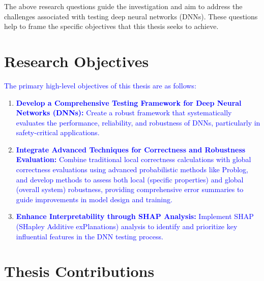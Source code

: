   \smallskip\noindent%
  The above research questions guide the investigation and aim to address the challenges associated with testing deep neural networks (DNNs). These questions help to frame the specific objectives that this thesis seeks to achieve. 
  
  \section{Research Objectives}
  
  \textcolor{blue}{The primary high-level objectives of this thesis are as follows:}
  
  \begin{enumerate}
    \item \textcolor{blue}{\textbf{Develop a Comprehensive Testing Framework for Deep Neural Networks (DNNs):}
    Create a robust framework that systematically evaluates the performance, reliability, and robustness of DNNs, particularly in safety-critical applications.}
    
    \item \textcolor{blue}{\textbf{Integrate Advanced Techniques for Correctness and Robustness Evaluation:}
    Combine traditional local correctness calculations with global correctness evaluations using advanced probabilistic methods like Problog, and develop methods to assess both local (specific properties) and global (overall system) robustness, providing comprehensive error summaries to guide improvements in model design and training.}
    
    \item \textcolor{blue}{\textbf{Enhance Interpretability through SHAP Analysis:}
    Implement SHAP (SHapley Additive exPlanations) analysis to identify and prioritize key influential features in the DNN testing process.}
    
\end{enumerate}


\section{Thesis Contributions}\hypertarget{contributions}{}

